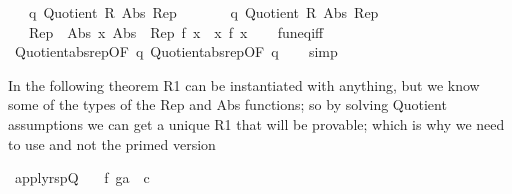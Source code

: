 \begin{isabellebody}
\ \ \ q{}{\isacharcolon}{\kern0pt}\ {\isachardoublequoteopen}Quotient{}\ R{}\ Abs{}\ Rep{}{\isachardoublequoteclose}\isanewline
\ \ \ \ \ \ \ q{}{\isacharcolon}{\kern0pt}\ {\isachardoublequoteopen}Quotient{}\ R{}\ Abs{}\ Rep{}{\isachardoublequoteclose}\isanewline
\ \ \ {\isachardoublequoteopen}{\isacharparenleft}{\kern0pt}Rep{}\ {\isacharminus}{\kern0pt}{\isacharminus}{\kern0pt}{\isacharminus}{\kern0pt}{\isachargreater}{\kern0pt}\ Abs{}{\isacharparenright}{\kern0pt}\ {\isacharparenleft}{\kern0pt}{\isasymlambda}x{\isachardot}{\kern0pt}\ {\isacharparenleft}{\kern0pt}Abs{}\ {\isacharminus}{\kern0pt}{\isacharminus}{\kern0pt}{\isacharminus}{\kern0pt}{\isachargreater}{\kern0pt}\ Rep{}{\isacharparenright}{\kern0pt}\ f\ x{\isacharparenright}{\kern0pt}\ {\isacharequal}{\kern0pt}\ {\isacharparenleft}{\kern0pt}{\isasymlambda}x{\isachardot}{\kern0pt}\ f\ x{\isacharparenright}{\kern0pt}{\isachardoublequoteclose}\isanewline
%
\isadelimproof
\ \ %
\endisadelimproof
%
\isatagproof
{}\isamarkupfalse%
\ fun{\isacharunderscore}{\kern0pt}eq{\isacharunderscore}{\kern0pt}iff\isanewline
\ \ \isamarkupfalse%
\ Quotient{}{\isacharunderscore}{\kern0pt}abs{\isacharunderscore}{\kern0pt}rep{\isacharbrackleft}{\kern0pt}OF\ q{}{\isacharbrackright}{\kern0pt}\ Quotient{}{\isacharunderscore}{\kern0pt}abs{\isacharunderscore}{\kern0pt}rep{\isacharbrackleft}{\kern0pt}OF\ q{}{\isacharbrackright}{\kern0pt}\isanewline
\ \ \isamarkupfalse%
\ simp%
\endisatagproof
{\isafoldproof}%
%
\isadelimproof
%
\endisadelimproof
%
\begin{isamarkuptext}%
In the following theorem R1 can be instantiated with anything,
  but we know some of the types of the Rep and Abs functions;
  so by solving Quotient assumptions we can get a unique R1 that
  will be provable; which is why we need to use  and
  not the primed version%
\end{isamarkuptext}\isamarkuptrue%
\isamarkupfalse%
\ apply{\isacharunderscore}{\kern0pt}rspQ{}{\isacharcolon}{\kern0pt}\isanewline
\ \ \ f\ g{\isacharcolon}{\kern0pt}{\isacharcolon}{\kern0pt}{\isachardoublequoteopen}{\isacharprime}{\kern0pt}a\ {\isasymRightarrow}\ {\isacharprime}{\kern0pt}c{\isachardoublequoteclose}\isanewline

\end{isabellebody}
